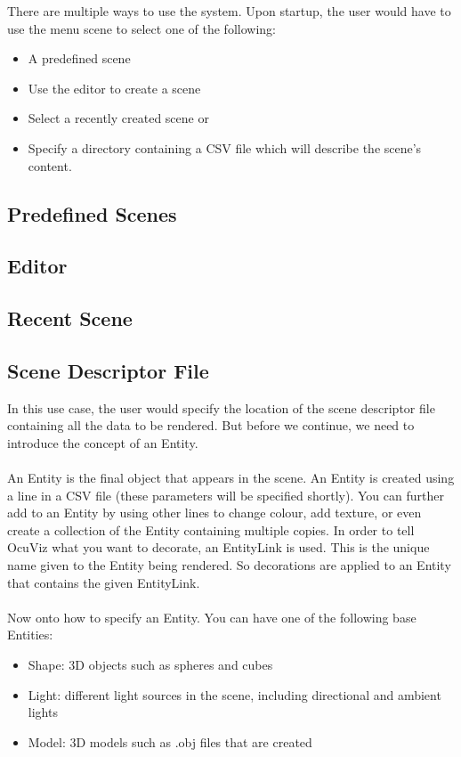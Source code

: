 \documentclass[a4paper,12pt]{article}
\begin{document}
There are multiple ways to use the system. Upon startup, the user would have to use the menu scene to select one of the following:

\begin{itemize}
\item A predefined scene
\item Use the editor to create a scene
\item Select a recently created scene or
\item Specify a directory containing a CSV file which will describe the scene's content.
\end{itemize}

\subsection{Predefined Scenes}

\newpage
\subsection{Editor}

\newpage
\subsection{Recent Scene}

\newpage
\subsection{Scene Descriptor File}

In this use case, the user would specify the location of the scene descriptor file containing all the data to be rendered. But before we continue, we need to introduce the concept of an Entity. 
\\\\
An Entity is the final object that appears in the scene. An Entity is created using a line in a CSV file (these parameters will be specified shortly). You can further add to an Entity by using other lines to change colour, add texture, or even create a collection of the Entity containing multiple copies. In order to tell OcuViz what you want to decorate, an EntityLink is used. This is the unique name given to the Entity being rendered. So decorations are applied to an Entity that contains the given EntityLink.
\\
\\
Now onto how to specify an Entity. You can have one of the following base Entities:
\begin{itemize}
\item Shape: 3D objects such as spheres and cubes
\item Light: different light sources in the scene, including directional and ambient lights
\item Model: 3D models such as .obj files that are created
\end{itemize}
\end{document}
